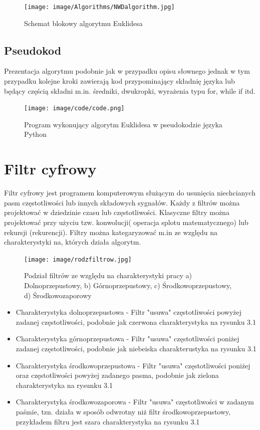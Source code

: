 \documentclass[eng, pl, oneside, openright, final, openbib]{mgr}\DeclareUnicodeCharacter{0301}{\'{e}}
\begin{document}
\begin{figure}[hp]
\centering
\texttt{[image: image/Algorithms/NWDalgorithm.jpg]}
\caption{Schemat blokowy algorytmu Euklidesa}
\end{figure}

\newpage
\section{Pseudokod}
Prezentacja algorytmu podobnie jak w przypadku opisu słownego jednak w tym przypadku kolejne kroki zawierają kod przypominający składnię języka lub będący częścią składni m.in. średniki, dwukropki, wyrażenia typu for, while if itd.

\begin{figure}[h]
\texttt{[image: image/code/code.png]}
\caption{Program wykonujący algorytm Euklidesa w pseudokodzie języka Python}
\end{figure}


\chapter{Filtr cyfrowy}
Filtr cyfrowy jest programem komputerowym służącym do usunięcia niechcianych pasm częstotliwości lub innych składowych sygnałów.
Każdy z filtrów można projektować w dziedzinie czasu lub częstotliwości. Klasyczne filtry można projektować przy użyciu tzw. konwolucji( operacja splotu matematycznego) lub rekursji (rekurencji). Filtry można kategaryzować m.in ze względu  na charakterystyki na, których działa algorytm. 
\newline 
\begin{figure}[hp]
\centering
\texttt{[image: image/rodzfiltrow.jpg]}
\caption{Podział filtrów ze względu na charakterystyki pracy a) Dolnoprzepustowy, b) Górnoprzepustowy, c) Środkowoprzepustowy, d) Środkowozaporowy}
\end{figure}
\newpage
\begin{itemize}
\item Charakterystyka dolnoprzepustowa - Filtr "usuwa" częstotliwości powyżej zadanej częstotliwości, podobnie jak czerwona charakterystyka na rysunku 3.1
\item Charakterystyka górnoprzepustowa - Filtr "usuwa" częstotliwości poniżej zadanej częstotliwości, podobnie jak niebeiska charakterustyka na rysunku 3.1
\item Charakterystyka środkowoprzepustowa - Filtr "usuwa" częstotliwości poniżej oraz częstotliwości powyżej zadanego pasma, podobnie jak zielona charakterystyka na rysunku 3.1
\item Charakterystyka środkowozaporowa - Filtr "usuwa" częstotliwości w zadanym paśmie, tzn. działa w sposób odwrotny niż filtr środkowoprzepustowy, przykładem filtru jest szara charakterystyka  na rysunku 3.1
\end{itemize}
\end{document}
